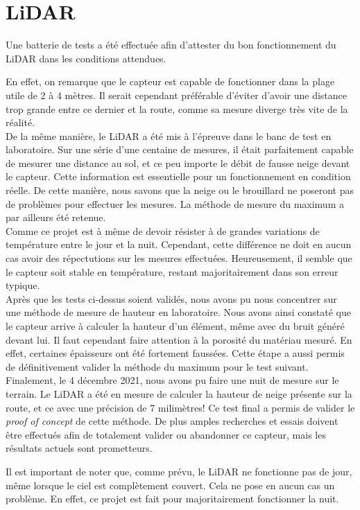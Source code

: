 \section{LiDAR}
Une batterie de tests a été effectuée afin d'attester du bon fonctionnement du LiDAR dans les conditions
attendues.\par
En effet, on remarque que le capteur est capable de fonctionner dans la plage utile de 2 à 
4 mètres. Il serait cependant préférable d'éviter d'avoir une distance trop grande entre ce dernier et 
la route, comme sa mesure diverge très vite de la réalité. \\
De la même manière, le LiDAR a été mis à l'épreuve dans le banc de test en laboratoire. Sur une série 
d'une centaine de mesures, il était parfaitement capable de mesurer une distance au sol, et ce peu importe 
le débit de fausse neige devant le capteur. Cette information est essentielle pour un fonctionnement en
condition réelle. De cette manière, nous savons que la neige ou le brouillard ne poseront pas de problèmes 
pour effectuer les mesures. La méthode de mesure du maximum a par ailleurs été retenue.\\
Comme ce projet est à même de devoir résister à de grandes variations de température entre le jour et
la nuit. Cependant, cette différence ne doit en aucun cas avoir des répectutions sur les mesures effectuées.
Heureusement, il semble que le capteur soit stable en température, restant majoritairement dans son 
erreur typique.\\
Après que les tests ci-dessus soient validés, nous avons pu nous concentrer sur une méthode de mesure de 
hauteur en laboratoire. Nous avons ainsi constaté que le capteur arrive à calculer la hauteur d'un élément,
même avec du bruit généré devant lui. Il faut cependant faire attention à la porosité du matériau mesuré. En
effet, certaines épaisseurs ont été fortement faussées. Cette étape a aussi permis de définitivement valider
la méthode du maximum pour le test suivant.\\
Finalement, le 4 décembre 2021, nous avons pu faire une nuit de mesure sur le terrain. Le LiDAR a été en
mesure de calculer la hauteur de neige présente sur la route, et ce avec une
précision de 7 milimètres! Ce test final a permis de valider le \emph{proof of concept} de cette méthode. De plus amples
recherches et essais doivent être effectués afin de totalement valider ou abandonner ce capteur, mais les
résultats actuels sont prometteurs.\par 
Il est important de noter que, comme prévu, le LiDAR ne fonctionne pas de jour, même lorsque le ciel
est complètement couvert. Cela ne pose en aucun cas un problème. En effet, ce projet est fait pour 
majoritairement fonctionner la nuit.

